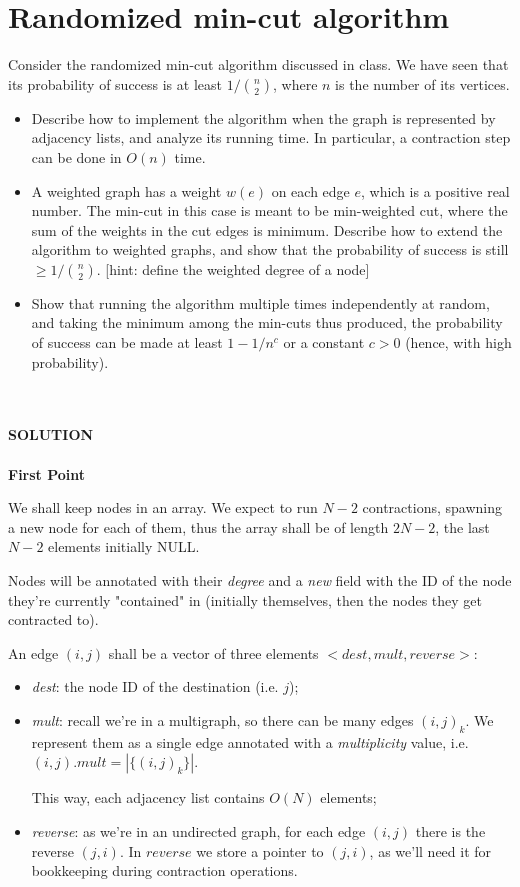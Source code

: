 \documentclass[a4paper]{article}
\begin{document}
\section*{Randomized min-cut algorithm}
Consider the randomized min-cut algorithm discussed in class.
We have seen that its probability of success is at least $1 / \binom{n}{2}$, where $n$ is the number of its vertices.
\begin{itemize}
\item Describe how to implement the algorithm when the graph is represented by adjacency lists, and analyze its running time.
In particular, a contraction step can be done in $O(n)$ time.
\item A weighted graph has a weight $w(e)$ on each edge $e$, which  is  a  positive  real number.
The  min-cut  in  this  case  is  meant  to  be  min-weighted  cut,  where  the sum  of  the  weights  in  the  cut  edges  is  minimum.
Describe  how  to  extend  the algorithm  to  weighted  graphs,  and  show  that  the  probability  of  success  is  still $\geq 1/\binom{n}{2}$. [hint: define the weighted degree of a node]
\item Show that running the algorithm multiple times independently at random, and taking the minimum among the min-cuts thus produced, the probability of success can be made at least $1 - 1/n^c$ or a constant $c > 0$ (hence, with high probability).
\end{itemize}
\
\\
\\
\textbf{SOLUTION}
\\
\\

\noindent
\textbf{First Point}

We shall keep nodes in an array. We expect to run $N-2$ contractions, spawning a new node for each of them, thus the array shall be of length $2N-2$, the last $N-2$ elements initially NULL.

Nodes will be annotated with their \emph{degree} and a \emph{new} field with the ID of the node they're currently "contained" in (initially themselves, then the nodes they get contracted to).

An edge $(i,j)$ shall be a vector of three elements $<dest, mult, reverse>$:
\begin{itemize}
\item \emph{dest}: the node ID of the destination (i.e. $j$);
\item \emph{mult}: recall we're in a multigraph, so there can be many edges $(i,j)_k$. We represent them as a single edge annotated with a \emph{multiplicity} value, i.e. $(i,j).mult = |\{(i,j)_k\}|$.

This way, each adjacency list contains $O(N)$ elements;
\item \emph{reverse}: as we're in an undirected graph, for each edge $(i,j)$ there is the reverse $(j,i)$. In $reverse$ we store a pointer to $(j,i)$, as we'll need it for bookkeeping during contraction operations.
\end{itemize}
\end{document}

